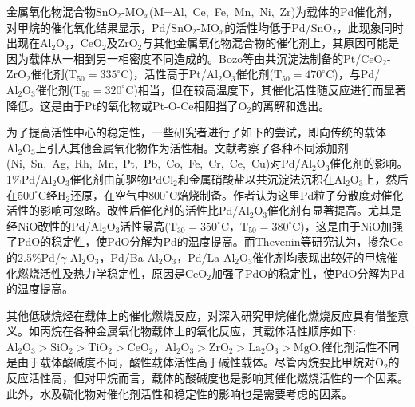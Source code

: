 金属氧化物混合物$\mathrm{SnO}_2$-$\mathrm{MO}_x$(\textrm{M=Al,~Ce,~Fe,~Mn,~Ni,~Zr})为载体的\textrm{Pd}催化剂\cite{CataD59-19_2000}，对甲烷的催化氧化结果显示，\textrm{Pd}/$\mathrm{SnO}_2$-$\mathrm{MO}_x$的活性均低于\textrm{Pd}/$\mathrm{SnO}_2$，此现象同时出现在$\mathrm{Al}_2\mathrm{O}_3$，$\mathrm{CeO}_2$及$\mathrm{ZrO}_2$与其他金属氧化物混合物的催化剂上，其原因可能是因为载体从一相到另一相密度不同造成的。\textrm{Bozo}等\cite{CataT59-33_2000}由共沉淀法制备的\textrm{Pt}/$\mathrm{CeO}_2$-$\mathrm{ZrO}_2$催化剂($\mathrm{T}_{50}=335^{\circ}\mathrm{C}$)，活性高于Pt/$\mathrm{Al}_2\mathrm{O}_3$催化剂($\mathrm{T}_{50}=470^{\circ}\mathrm{C}$)，与Pd/$\mathrm{Al}_2\mathrm{O}_3$催化剂($\mathrm{T}_{50}=320^{\circ}\mathrm{C}$)相当，但在较高温度下，其催化活性随反应进行而显著降低。这是由于\textrm{Pt}的氧化物或\textrm{Pt}-\textrm{O}-\textrm{Ce}相阻挡了$\mathrm{O}_2$的离解和逸出。

为了提高活性中心的稳定性，一些研究者进行了如下的尝试，即向传统的载体$\mathrm{Al}_2\mathrm{O}_3$上引入其他金属氧化物作为活性相。文献考察了各种不同添加剂(\textrm{Ni,~Sn,~Ag,~Rh,~Mn,~Pt,~Pb,~Co,~Fe,~Cr,~Ce,~Cu})对\textrm{Pd}/$\mathrm{Al}_2\mathrm{O}_3$催化剂的影响。1\%\textrm{Pd}/$\mathrm{Al}_2\mathrm{O}_3$催化剂由前驱物$\mathrm{PdCl}_2$和金属硝酸盐以共沉淀法沉积在$\mathrm{Al}_2\mathrm{O}_3$上，然后在$500^{\circ}\mathrm{C}$经$\mathrm{H}_2$还原，在空气中$800^{\circ}\mathrm{C}$焙烧制备。作者认为这里\textrm{Pd}粒子分散度对催化活性的影响可忽略。改性后催化剂的活性比\textrm{Pd}/$\mathrm{Al}_2\mathrm{O}_3$催化剂有显著提高。尤其是经\textrm{NiO}改性的\textrm{Pd}/$\mathrm{Al}_2\mathrm{O}_3$活性最高($\mathrm{T}_{30}=350^{\circ}\mathrm{C}$，$\mathrm{T}_{50}=380^{\circ}\mathrm{C}$)，这是由于\textrm{NiO}加强了\textrm{PdO}的稳定性，使\textrm{PdO}分解为\textrm{Pd}的温度提高。而\textrm{Thevenin}\cite{JCata215-78_2003}等研究认为，掺杂\textrm{Ce}的2.5\%\textrm{Pd}/$\gamma$-$\mathrm{Al}_2\mathrm{O}_3$，\textrm{Pd}/\textrm{Ba}-$\mathrm{Al}_2\mathrm{O}_3$，\textrm{Pd}/\textrm{La}-$\mathrm{Al}_2\mathrm{O}_3$催化剂均表现出较好的甲烷催化燃烧活性及热力学稳定性，原因是$\mathrm{CeO}_2$加强了\textrm{PdO}的稳定性，使\textrm{PdO}分解为\textrm{Pd}的温度提高。

其他低碳烷烃在载体上的催化燃烧反应，对深入研究甲烷催化燃烧反应具有借鉴意义。如丙烷在各种金属氧化物载体上的氧化反应，其载体活性顺序如下:~$\mathrm{Al}_2\mathrm{O}_3>\mathrm{SiO}_2>\mathrm{TiO}_2>\mathrm{CeO}_2$，$\mathrm{Al}_2\mathrm{O}_3>\mathrm{ZrO}_2>\mathrm{La}_2\mathrm{O}_3>\mathrm{MgO}$.催化剂活性不同是由于载体酸碱度不同，酸性载体活性高于碱性载体\cite{ACA211-159_2001}。尽管丙烷要比甲烷对$\mathrm{O}_2$的反应活性高，但对甲烷而言，载体的酸碱度也是影响其催化燃烧活性的一个因素。此外，水及硫化物对催化剂活性和稳定性的影响也是需要考虑的因素。

